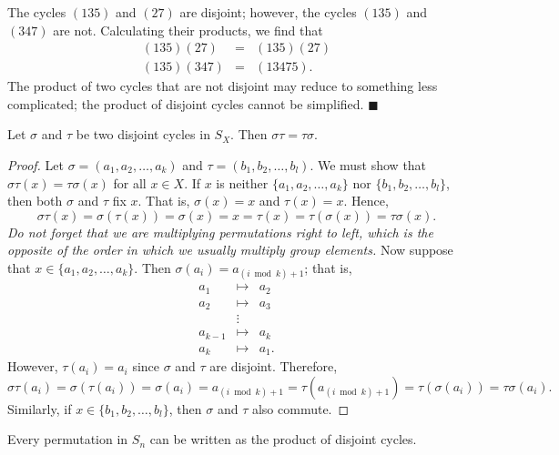  
\vspace{2ex}
 
 
The  cycles $(1 3 5)$ and $(2 7 )$ are disjoint; however, the cycles
$(1 3 5)$ and $(3 4 7 )$ are not.  Calculating their products, we find
that 
\begin{eqnarray*}
(1 3 5)(2 7 ) & = & (1 3 5)(2 7 ) \\
(1 3 5)(3 4 7 ) & = & (1 3 4 7 5).
\end{eqnarray*}
The product of two cycles that are not disjoint may reduce to
something less complicated; the product of disjoint cycles cannot be 
simplified. 
\hspace{\fill} $\blacksquare$
 
 
\begin{proposition}
Let $\sigma$ and $\tau$ be two disjoint cycles in $S_X$. Then $\sigma
\tau = \tau \sigma$. 
\end{proposition}
 
\begin{proof}
Let $\sigma = (a_1, a_2, \ldots, a_k )$ and $\tau = (b_1, b_2, \ldots,
b_l )$. We must show that $\sigma \tau(x) = \tau \sigma(x)$ for all $x
\in X$. If $x$ is neither $\{ a_1, a_2, \ldots, a_k \}$ nor $\{b_1,
b_2, \ldots, b_l  \}$, then both $\sigma$ and $\tau$ fix $x$. That is,
$\sigma(x)=x$ and $\tau(x)=x$. Hence, 
$$
\sigma \tau(x) = \sigma( \tau(x)) = \sigma(x) = x = \tau(x)
= \tau( \sigma(x)) =  \tau \sigma(x).
$$
{\em Do not forget that we are multiplying permutations right to left,
which is the opposite of the order in which we usually multiply group
elements.}  Now suppose that $x \in \{ a_1, a_2, \ldots, a_k \}$. Then 
$\sigma( a_i ) = a_{(i \bmod k) + 1}$; that is, 
\begin{eqnarray*}
a_1 & \mapsto & a_2 \\
a_2 & \mapsto & a_3 \\
& \vdots & \\
a_{k-1} & \mapsto & a_k \\
a_k & \mapsto & a_1.
\end{eqnarray*}
However, $\tau(a_i) = a_i$ since $\sigma$ and $\tau$ are disjoint.
Therefore, 
$$
\sigma \tau(a_i) = \sigma( \tau(a_i)) = \sigma(a_i) = a_{(i \bmod
k)+1}
= \tau( a_{(i \bmod k)+1} ) = \tau( \sigma(a_i) ) = \tau \sigma(a_i).
$$
Similarly, if $x \in \{b_1, b_2, \ldots, b_l  \}$, then $\sigma$ and
$\tau$ also commute. 
\end{proof}
 
\begin{theorem}
Every permutation in $S_n$ can be written as the product of disjoint
cycles. 
\end{theorem}
 
